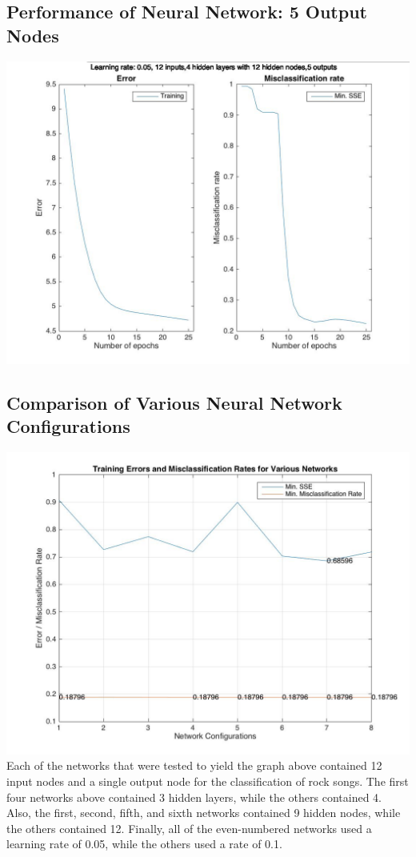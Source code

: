 \documentclass[12pt]{article}
\begin{document}
\subsection{Performance of Neural Network: 5 Output Nodes}
\label{subsec:annBetterPerformance}
\includegraphics[scale=0.3]{images/ann/slightlyBetterWithTop5Genres2}

\subsection{Comparison of Various Neural Network Configurations}
\label{subsec:variousANN}
\includegraphics[scale=0.3]{images/ann/graphOfVariousNetworksWith1Genre}
\\
Each of the networks that were tested to yield the graph above contained 12 input nodes and a single output node for the classification of rock songs. The first four networks above contained 3 hidden layers, while the others contained 4. Also, the first, second, fifth, and sixth networks contained 9 hidden nodes, while the others contained 12. Finally, all of the even-numbered networks used a learning rate of 0.05, while the others used a rate of 0.1.
\end{document}
